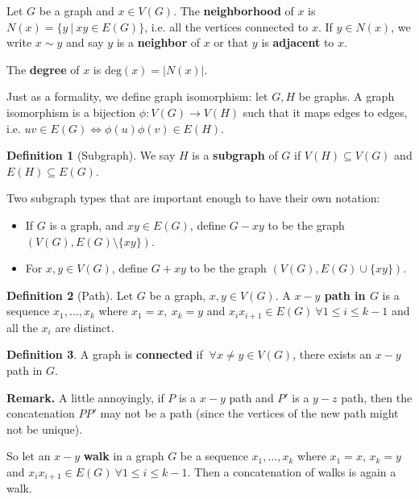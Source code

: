 \documentclass{article}
\theoremstyle{definition}
\newtheorem{defn}{Definition}[section]
\begin{document}
Let $G$ be a graph and $x \in V(G)$. The \textbf{neighborhood} of $x$ is $N(x) = \{y ~|~ xy \in E(G)\}$, i.e. all the vertices connected to $x$. If $y \in N(x)$, we write $x \sim y$ and say $y$ is a \textbf{neighbor} of $x$ or that $y$ is \textbf{adjacent} to $x$.

\vspace{1mm}

The \textbf{degree} of $x$ is $\text{deg}(x) = |N(x)|$.

Just as a formality, we define graph isomorphism: let $G, H$ be graphs. A graph isomorphism is a bijection $\phi : V(G) \to V(H)$ such that it maps edges to edges, i.e. $uv \in E(G) \iff \phi(u)\phi(v) \in E(H)$.

\begin{defn}[Subgraph]
    We say $H$ is a \textbf{subgraph} of $G$ if $V(H) \subseteq V(G)$ and $E(H) \subseteq E(G)$.
\end{defn}

Two subgraph types that are important enough to have their own notation:

\begin{itemize}
    \item If $G$ is a graph, and $xy \in E(G)$, define $G - xy$ to be the graph $(V(G), E(G) \setminus \{xy\})$.
    \item For $x,y \in V(G)$, define $G+xy$ to be the graph $(V(G), E(G) \cup \{xy\})$.
\end{itemize}

\begin{defn}[Path]
    Let $G$ be a graph, $x,y \in V(G)$. A \textbf{$x-y$ path in $G$} is a sequence $x_1, \ldots, x_k$ where $x_1 = x, ~x_k = y$ and $x_ix_{i+1} \in E(G) ~\forall 1\le i \le k-1$ and all the $x_i$ are distinct.     
\end{defn}

\begin{defn}
    A graph is \textbf{connected} if $~\forall x \neq y \in V(G)$, there exists an $x-y$ path in $G$.
\end{defn}

\textbf{Remark.} A little annoyingly, if $P$ is a $x-y$ path and $P'$ is a $y-z$ path, then the concatenation $PP'$ may not be a path (since the vertices of the new path might not be unique).

So let an $x-y$ \textbf{walk} in a graph $G$ be a sequence $x_1,\ldots, x_k$ where ${x_1 = x}$, $x_k = y$ and $x_ix_{i+1} \in E(G) ~\forall 1\le i\le k-1$. Then a concatenation of walks is again a walk.
\end{document}
